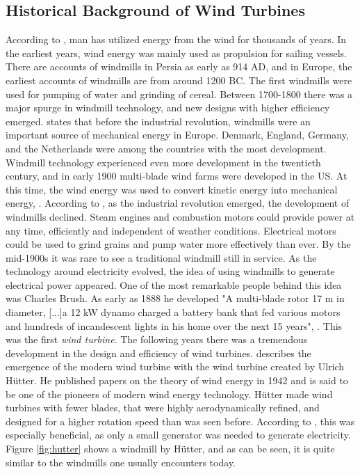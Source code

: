 \subsection{Historical Background of Wind Turbines}
According to \cite{Wagner2013}, man has utilized energy from the wind for thousands of years. In the earliest years, wind energy was mainly used as propulsion for sailing vessels. There are accounts of windmills in Persia as early as 914 AD, and in Europe, the earliest accounts of windmills are from around 1200 BC. The first windmills were used for pumping of water and grinding of cereal. Between 1700-1800 there was a major spurge in windmill technology, and new designs with higher efficiency emerged. \cite{Lynn2011} states that before the industrial revolution, windmills were an important source of mechanical energy in Europe. Denmark, England, Germany, and the Netherlands were among the countries with the most development. Windmill technology experienced even more development in the twentieth century, and in early 1900 multi-blade wind farms were developed in the US. At this time, the wind energy was used to convert kinetic energy into mechanical energy, \cite{Hau2013}. According to \cite{Lynn2011}, as the industrial revolution emerged, the development of windmills declined. Steam engines and combustion motors could provide power at any time, efficiently and independent of weather conditions. Electrical motors could be used to grind grains and pump water more effectively than ever. By the mid-1900s it was rare to see a traditional windmill still in service. \newline 
\newline
As the technology around electricity evolved, the idea of using windmills to generate electrical power appeared. One of the most remarkable people behind this idea was Charles Brush. As early as 1888 he developed "A multi-blade rotor 17 m in diameter, [...]a 12 kW dynamo charged a battery bank that fed various motors and hundreds of incandescent lights in his home over the next 15 years", \cite{Lynn2011}. This was the first \textit{wind turbine}. The following years there was a tremendous development in the design and efficiency of wind turbines. \cite{Hau2013} describes the emergence of the modern wind turbine with the wind turbine created by Ulrich Hütter. He published papers on the theory of wind energy in 1942 and is said to be one of the pioneers of modern wind energy technology. Hütter made wind turbines with fewer blades, that were highly aerodynamically refined, and designed for a higher rotation speed than was seen before. According to \cite{Wagner2013}, this was especially beneficial, as only a small generator was needed to generate electricity. Figure \ref{fig:hutter} shows a windmill by Hütter, and as can be seen, it is quite similar to the windmills one usually encounters today. \newline
\newline

